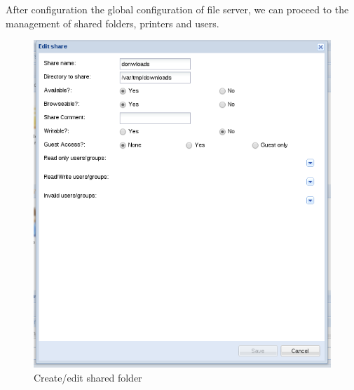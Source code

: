 After configuration the global configuration of file server, we can proceed to the management of shared folders, printers and users.

\begin{figure}[H]
    \begin{center}
    \includegraphics[scale=0.38]{screenshots/etfs/etfs_edit_file_share.png}
    \caption{Create/edit shared folder}
    \label{fig:etfs_edit_file_share}
    \end{center}
\end{figure}

